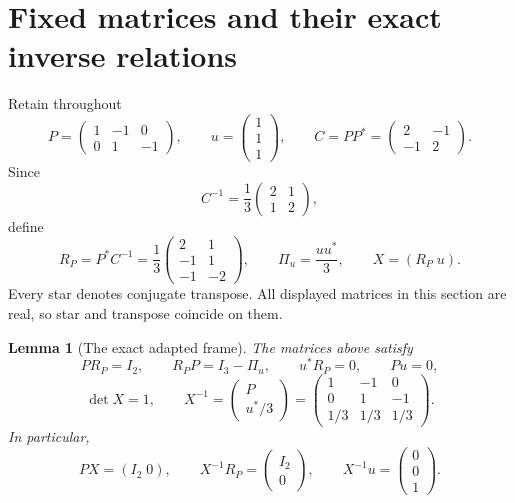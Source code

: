 \documentclass[11pt]{article}
\newtheorem{lemma}[theorem]{Lemma}
\theoremstyle{definition}
\begin{document}
\tableofcontents

\section{Fixed matrices and their exact inverse relations}

Retain throughout
\[
 P=\begin{pmatrix}1&-1&0\\0&1&-1\end{pmatrix},
 \qquad
 u=\begin{pmatrix}1\\1\\1\end{pmatrix},
 \qquad
 C=PP^*=\begin{pmatrix}2&-1\\-1&2\end{pmatrix}.
\]
Since
\[
 C^{-1}=\frac13\begin{pmatrix}2&1\\1&2\end{pmatrix},
\]
define
\[
 R_P=P^*C^{-1}
 =\frac13\begin{pmatrix}2&1\\-1&1\\-1&-2\end{pmatrix},
 \qquad
 \Pi_u=\frac{uu^*}{3},
 \qquad
 X=(R_P\;u).
\]
Every star denotes conjugate transpose.  All displayed matrices in this section are real, so star and transpose coincide on them.

\begin{lemma}[The exact adapted frame]\label{lem:frame}
The matrices above satisfy
\[
 PR_P=I_2,\qquad R_PP=I_3-\Pi_u,\qquad
 u^*R_P=0,\qquad Pu=0,
\]
\[
 \det X=1,
 \qquad
 X^{-1}=\begin{pmatrix}P\\u^*/3\end{pmatrix}
 =\begin{pmatrix}
 1&-1&0\\0&1&-1\\1/3&1/3&1/3
 \end{pmatrix}.
\]
In particular,
\[
 PX=(I_2\;0),\qquad
 X^{-1}R_P=\begin{pmatrix}I_2\\0\end{pmatrix},\qquad
 X^{-1}u=\begin{pmatrix}0\\0\\1\end{pmatrix}.
\]
\end{lemma}
\end{document}
